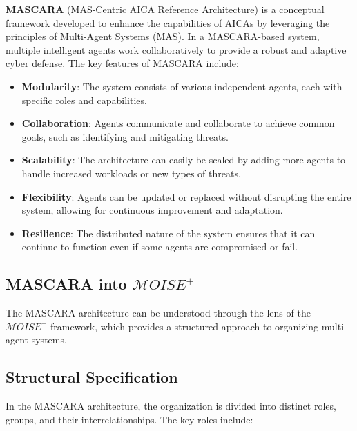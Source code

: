 \documentclass[conference]{IEEEtran}
\newcounter{relation}
\begin{document}
\textbf{MASCARA} (MAS-Centric AICA Reference Architecture) is a conceptual framework developed to enhance the capabilities of AICAs by leveraging the principles of Multi-Agent Systems (MAS). In a MASCARA-based system, multiple intelligent agents work collaboratively to provide a robust and adaptive cyber defense. The key features of MASCARA include:

\begin{itemize}
    \item \textbf{Modularity}: The system consists of various independent agents, each with specific roles and capabilities.
    \item \textbf{Collaboration}: Agents communicate and collaborate to achieve common goals, such as identifying and mitigating threats.
    \item \textbf{Scalability}: The architecture can easily be scaled by adding more agents to handle increased workloads or new types of threats.
    \item \textbf{Flexibility}: Agents can be updated or replaced without disrupting the entire system, allowing for continuous improvement and adaptation.
    \item \textbf{Resilience}: The distributed nature of the system ensures that it can continue to function even if some agents are compromised or fail.
\end{itemize}

\subsection{MASCARA into $\mathcal{M}OISE^+$}

The MASCARA architecture can be understood through the lens of the $\mathcal{M}OISE^+$ framework, which provides a structured approach to organizing multi-agent systems.

\subsection*{Structural Specification}

In the MASCARA architecture, the organization is divided into distinct roles, groups, and their interrelationships. The key roles include:
\end{document}
